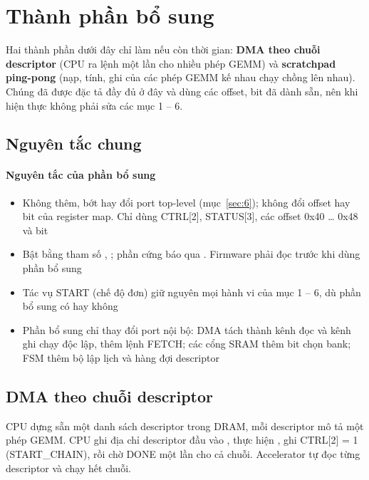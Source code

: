 \section{Thành phần bổ sung}\label{sec:7}


Hai thành phần dưới đây chỉ làm nếu còn thời gian: \textbf{DMA theo chuỗi descriptor} (CPU ra lệnh một lần cho nhiều phép GEMM) và \textbf{scratchpad ping-pong} (nạp, tính, ghi của các phép GEMM kế nhau chạy chồng lên nhau). Chúng đã được đặc tả đầy đủ ở đây và dùng các offset, bit đã dành sẵn, nên khi hiện thực không phải sửa các mục 1 – 6.


\subsection{Nguyên tắc chung}\label{sec:7.1}


\paragraph{Nguyên tắc của phần bổ sung}\label{tab:7-1}
\begin{itemize}
\item Không thêm, bớt hay đổi port top-level (mục~\ref{sec:6}); không đổi offset hay bit của register map. Chỉ dùng CTRL[2], STATUS[3], các offset 0x40 … 0x48 và bit 
\item Bật bằng tham số , ; phần cứng báo qua . Firmware phải đọc  trước khi dùng phần bổ sung
\item Tác vụ START (chế độ đơn) giữ nguyên mọi hành vi của mục 1 – 6, dù phần bổ sung có hay không
\item Phần bổ sung chỉ thay đổi port nội bộ: DMA tách thành kênh đọc và kênh ghi chạy độc lập, thêm lệnh FETCH; các cổng SRAM thêm bit chọn bank; FSM thêm bộ lập lịch và hàng đợi descriptor
\end{itemize}


\subsection{DMA theo chuỗi descriptor}\label{sec:7.2}

CPU dựng sẵn một danh sách descriptor trong DRAM, mỗi descriptor mô tả một phép GEMM. CPU ghi địa chỉ descriptor đầu vào , thực hiện , ghi CTRL[2] = 1 (START\_CHAIN), rồi chờ DONE một lần cho cả chuỗi. Accelerator tự đọc từng descriptor và chạy hết chuỗi.




